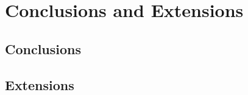 \chapter{Conclusions and Extensions}
\label{c:conclusion}
\section{Conclusions}
\section{Extensions}
